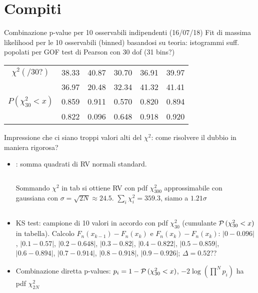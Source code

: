 \section{Compiti}

\begin{wordonframe}{Combinazione p-value per 10 osservabili indipendenti (16/07/18)}
	Fit di massima likelihood per le 10 osservabili (binned) basandosi su teoria: istogrammi suff. popolati per GOF test di Pearson con 30 dof (31 bins?)
	\begin{table}[h!]
		\centering
		\begin{tabular}{||cccccc||} 
			$\chi^2(/30?)$&38.33&40.87&30.70&36.91&39.97\\
			&36.97&20.48&32.34&41.32&41.41\\
			$P(\chi^2_{30}<x)$&0.859&0.911&0.570&0.820&0.894\\
			&0.822&0.096&0.648&0.918&0.920\\
		\end{tabular}
	\end{table}
	Impressione che ci siano troppi valori alti del $\chi^2$: come risolvere il dubbio in maniera rigorosa?
	\begin{itemize}
	\item {}: somma quadrati di RV normali standard. 
	\begin{columns}[T]\begin{column}{0.5\textwidth}
			Sommando $\chi^2$ in tab si ottiene RV con pdf $\chi^2_{300}$ approssimabile con gaussiana con $\sigma=\sqrt{2N}\approx24.5$.
			$\sum_i\chi^2_i=359.3$, siamo a $1.21\sigma$
		\end{column}\begin{column}{0.5\textwidth}
	\end{column}\end{columns}
	\item KS test: campione di 10 valori in accordo con pdf $\chi^2_{30}$ (cumulante $\operatorname{\mathcal{P}}{(\chi^2_{30}<x)}$ in tabella). Calcolo $F_n(x_{k-1})-F_n(x_k)$ e $F_n(x_k)-F_n(x_k)$:  $|0-0.096|$, $|0.1-0.57|$, $|0.2-0.648|$, $|0.3-0.82|$, $|0.4-0.822|$, $|0.5-0.859|$, $|0.6-0.894|$, $|0.7-0.914|$, $|0.8-0.918|$, $|0.9-0.926|$; $\Delta=0.52$??
	\item Combinazione diretta p-values: $p_i=1-\operatorname{\mathcal{P}}{(\chi^2_{30}<x)}$,  $-2\log{(\prod^Np_i)}$ ha pdf $\chi^2_{2N}$

\end{itemize}
\end{wordonframe}

